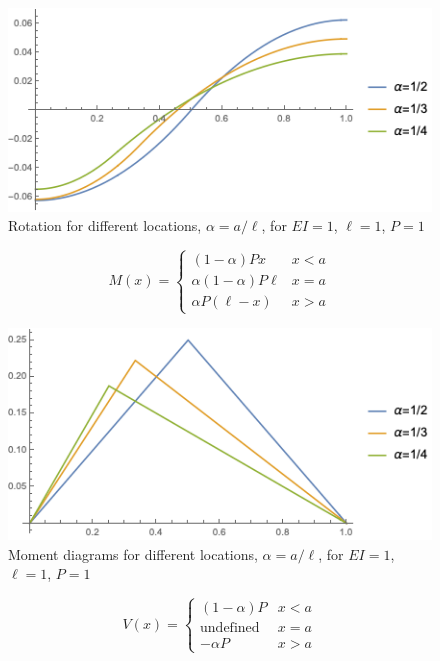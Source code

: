 \documentclass[11pt, oneside]{article}   	%
\begin{document}
\begin{figure}[htbp]
    \begin{center}
        \includegraphics[]{forceSlope.png}
        \caption{Rotation for different locations, $\alpha=a/\ell$, for $EI=1$, $\ell=1$, $P=1$}
        \label{default2}
    \end{center}
\end{figure}

\begin{equation}
   M(x) = \left\{ \begin{array}{ll}
                       (1-\alpha) P x  & x<a \\[2ex]
                       \alpha(1-\alpha) P \ell  & x=a \\[2ex]
                       \alpha P(\ell - x)  & x>a 
                      \end{array} \right.
   \label{B12}
\end{equation}

\begin{figure}[htbp]
    \begin{center}
        \includegraphics[]{forceMoment.png}
        \caption{Moment diagrams for different locations, $\alpha=a/\ell$, for $EI=1$, $\ell=1$, $P=1$}
        \label{default3}
    \end{center}
\end{figure}

\begin{equation}
   V(x) = \left\{ \begin{array}{ll}
                       (1-\alpha)P  & x<a \\[2ex]
                       \text{undefined}  & x=a \\[2ex]
                       -\alpha P  & x>a 
                      \end{array} \right.
   \label{B13}
\end{equation}
\end{document}
